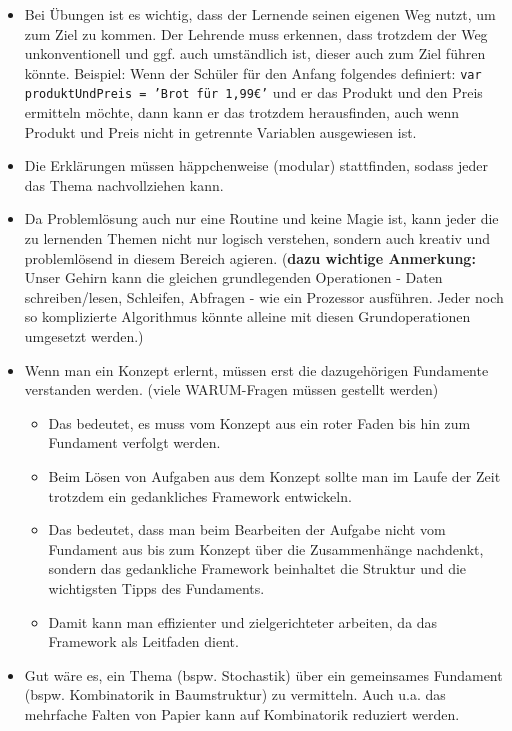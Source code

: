 \documentclass{article}
\begin{document}
        \begin{itemize}
          \item Bei Übungen ist es wichtig, dass der Lernende seinen eigenen Weg nutzt, um zum Ziel zu kommen.
              Der Lehrende muss erkennen, dass trotzdem der Weg unkonventionell und ggf. auch umständlich ist, dieser auch zum Ziel führen könnte.
              Beispiel: Wenn der Schüler für den Anfang folgendes definiert:
              \texttt{var produktUndPreis = 'Brot für 1,99€'}
              und er das Produkt und den Preis ermitteln möchte, dann kann er das trotzdem herausfinden, auch wenn Produkt und Preis nicht in getrennte Variablen ausgewiesen ist.
          


          \item Die Erklärungen müssen häppchenweise (modular) stattfinden, sodass jeder das Thema nachvollziehen kann.


          \item Da Problemlösung auch nur eine Routine und keine Magie ist, kann jeder die zu lernenden Themen nicht nur logisch verstehen, sondern auch kreativ und problemlösend in diesem Bereich agieren.
            (\textbf{dazu wichtige Anmerkung:} Unser Gehirn kann die gleichen grundlegenden Operationen - Daten schreiben/lesen, Schleifen, Abfragen - wie ein Prozessor ausführen. Jeder noch so komplizierte Algorithmus könnte alleine mit diesen Grundoperationen umgesetzt werden.)

        
          \item Wenn man ein Konzept erlernt, müssen erst die dazugehörigen Fundamente verstanden werden. (viele WARUM-Fragen müssen gestellt werden)

          \begin{itemize}
            \item Das bedeutet, es muss vom Konzept aus ein roter Faden bis hin zum Fundament verfolgt werden.

            \item Beim Lösen von Aufgaben aus dem Konzept sollte man im Laufe der Zeit trotzdem ein gedankliches Framework entwickeln.

            \item Das bedeutet, dass man beim Bearbeiten der Aufgabe nicht vom Fundament aus bis zum Konzept über die Zusammenhänge nachdenkt, sondern das gedankliche Framework beinhaltet die Struktur und die wichtigsten Tipps des Fundaments.

            \item Damit kann man effizienter und zielgerichteter arbeiten, da das Framework als Leitfaden dient.

          \end{itemize}

          \item Gut wäre es, ein Thema (bspw. Stochastik) über ein gemeinsames Fundament (bspw. Kombinatorik in Baumstruktur) zu vermitteln.
            Auch u.a. das mehrfache Falten von Papier kann auf Kombinatorik reduziert werden.
          

        \end{itemize}
    
\end{document}

